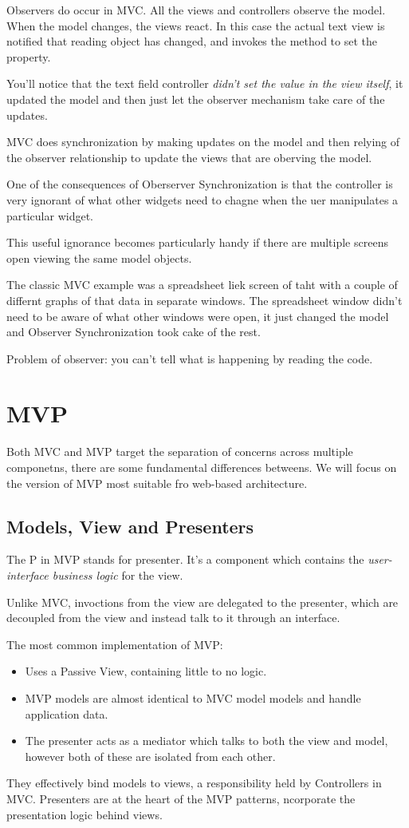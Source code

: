 \documentclass[a4paper, 11pt]{book}
\begin{document}
Observers do occur in MVC. All the views and controllers observe the model. When
the model changes, the views react. In this case the actual text view is
notified that reading object has changed, and invokes the method to set the
property. 

You'll notice that the text field controller \emph{didn't set the value in the
view itself}, it updated the model and then just let the observer mechanism take
care of the updates. 

MVC does synchronization by making updates on the model and then relying of the
observer relationship to update the views that are oberving the model.

One of the consequences of Oberserver Synchronization is that the controller is
very ignorant of what other widgets need to chagne when the uer manipulates a
particular widget.

This useful ignorance becomes particularly handy if there are multiple screens
open viewing the same model objects. 

The classic MVC example was a spreadsheet liek screen of taht with a couple of
differnt graphs of that data in separate windows. The spreadsheet window didn't
need to be aware of what other windows were open, it just changed the model and
Observer Synchronization took cake of the rest. 

Problem of observer: you can't tell what is happening by reading the code.


\section{MVP}
Both MVC and MVP target the separation of concerns across multiple componetns,
there are some fundamental differences betweens. We will focus on the version of
MVP most suitable fro web-based architecture.
\subsection{Models, View and Presenters}
The P in MVP stands for presenter. It's a component which contains the
\emph{user-interface business logic} for the view.

Unlike MVC, invoctions from the view are delegated to the presenter, which are
decoupled from the view and instead talk to it through an interface. 

The most common implementation of MVP:
\begin{itemize}
\item Uses a Passive View, containing little to no logic.
\item MVP models are almost identical to MVC model models and handle application
data. 
\item The presenter acts as a mediator which talks to both the view and model, 
however both of these are isolated from each other.
\end{itemize}
They effectively bind models to views, a responsibility held by Controllers in
MVC. Presenters are at the heart of the MVP patterns,
ncorporate the presentation logic behind views.
\end{document}
